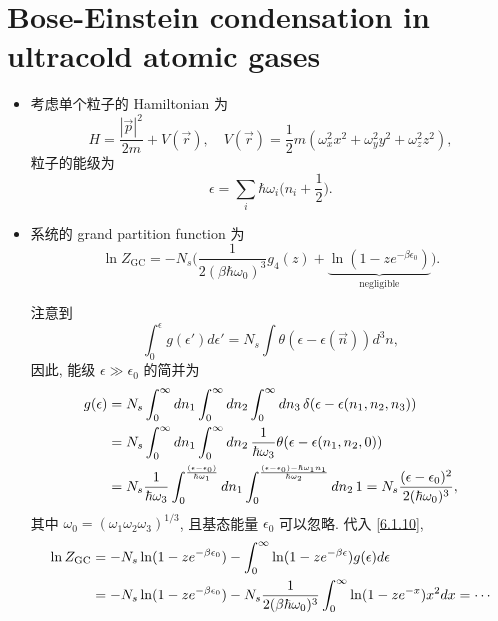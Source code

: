 \section{Bose-Einstein condensation in ultracold atomic gases}
\begin{itemize}
	\item 考虑单个粒子的 Hamiltonian 为
	\begin{equation}
		H = \frac{|\vec{p}|^2}{2 m} + V(\vec{r}), \quad V(\vec{r}) = \frac{1}{2} m (\omega_x^2 x^2 + \omega_y^2 y^2 + \omega_z^2 z^2),
	\end{equation}
	粒子的能级为
	\begin{equation}
		\epsilon = \sum_i \hbar \omega_i \Big( n_i + \frac{1}{2} \Big).
	\end{equation}
	
	\item 系统的 grand partition function 为
	\begin{equation}
		\ln Z_\text{GC} = - N_s \Big( \frac{1}{2 (\beta \hbar \omega_0)^3} g_4(z) + \underbrace{\ln(1 - z e^{- \beta \epsilon_0})}_{\text{negligible}} \Big).
	\end{equation}
	
	\begin{tcolorbox}[title=calculation:]
		注意到
		\begin{equation}
			\int_0^\epsilon g(\epsilon') d\epsilon' = N_s \int \theta(\epsilon - \epsilon(\vec{n})) d^3 n,
		\end{equation}
		因此, 能级 $\epsilon \gg \epsilon_0$ 的简并为
		\begin{align}
			g(\epsilon) &= N_s \int_0^\infty dn_1 \int_0^\infty dn_2 \int_0^\infty dn_3 \, \delta(\epsilon - \epsilon(n_1, n_2, n_3)) \notag \\
			&= N_s \int_0^\infty dn_1 \int_0^\infty dn_2 \, \frac{1}{\hbar \omega_3} \theta(\epsilon - \epsilon(n_1, n_2, 0)) \notag \\
			&= N_s \frac{1}{\hbar \omega_3} \int_0^{\frac{(\epsilon - \epsilon_0)}{\hbar \omega_1}} dn_1 \int_0^{\frac{(\epsilon - \epsilon_0) - \hbar \omega_1 n_1}{\hbar \omega_2}} dn_2 \, 1 = N_s \frac{(\epsilon - \epsilon_0)^2}{2 (\hbar \omega_0)^3},
		\end{align}
		其中 $\omega_0 = (\omega_1 \omega_2 \omega_3)^{1 / 3}$, 且基态能量 $\epsilon_0$ 可以忽略. 代入 \eqref{6.1.10},
		\begin{align}
			\ln Z_\text{GC} &= - N_s \ln(1 - z e^{- \beta \epsilon_0}) - \int_0^\infty \ln(1 - z e^{- \beta \epsilon}) g(\epsilon) d\epsilon \notag \\
			&= - N_s \ln(1 - z e^{- \beta \epsilon_0}) - N_s \frac{1}{2 (\beta \hbar \omega_0)^3} \int_0^\infty \ln(1 - z e^{- x}) x^2 dx = \cdots
		\end{align}
	\end{tcolorbox}
	

\end{itemize}

